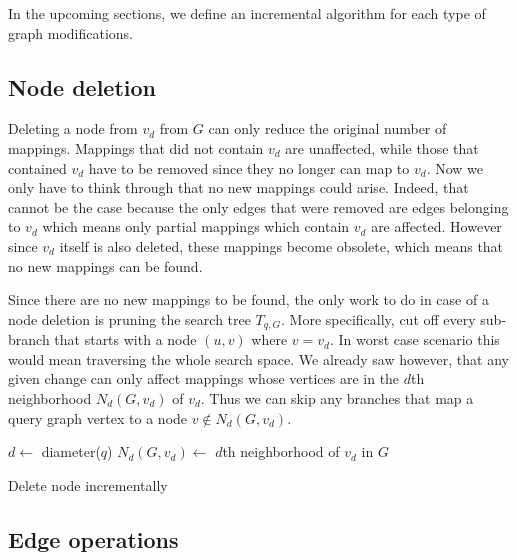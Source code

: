 In the upcoming sections, we define an incremental algorithm for each type of graph 
modifications.

\subsection{Node deletion}

Deleting a node from $v_d$ from $G$ can only reduce the original number of mappings.
Mappings that did not contain $v_d$ are unaffected, while those that contained $v_d$ 
have to be removed since they no longer can map to $v_d$. Now we only have to think 
through that no new mappings could arise. Indeed, that cannot be the case because
the only edges that were removed are edges belonging to $v_d$ which means only 
partial mappings which contain $v_d$ are affected. However since $v_d$ itself is also
deleted, these mappings become obsolete, which means that no new mappings can be
found.

Since there are no new mappings to be found, the only work to do in case of a node
deletion is pruning the search tree $T_{q, G}$. More specifically, cut off every
sub-branch that starts with a node $(u, v)$ where $v = v_d$. In worst case scenario
this would mean traversing the whole search space. We already saw however, that any
given change can only affect mappings whose vertices are in the $d$th neighborhood
$N_d(G, v_d)$ of $v_d$. Thus we can skip any branches that map a query graph vertex
to a node $v \notin N_d(G, v_d)$.

\begin{algorithm}[htp]
    \SetAlgoLined\DontPrintSemicolon
    \nl $d \gets $ diameter($q$)\;
    \nl $N_d(G, v_d) \gets$ $d$th neighborhood of $v_d$ in $G$\;
    \caption{Delete node incrementally}
\end{algorithm}

\subsection{Edge operations}

